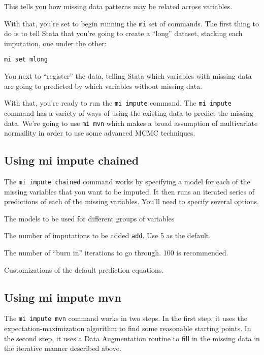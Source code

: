 \documentclass[12 pt]{article}
\begin{document}
This tells you how missing data patterns may be related across
variables. 

With that, you're set to begin running the \texttt{mi} set of
commands. The first thing to do is to tell Stata that you're going to
create a ``long'' dataset, stacking each imputation, one under the
other:

\texttt{mi set mlong}

You next to ``register'' the data, telling Stata which variables with
missing data are going to predicted by which variables without missing
data. 

With that, you're ready to run the \texttt{mi impute} command. The
\texttt{mi impute} command has a variety of ways of using the existing
data to predict the missing data. We're going to use \texttt{mi mvn}
which makes a broad assumption of multivariate normaility in order to
use some advanced MCMC techniques. 


\subsection{Using mi impute chained}
\label{sec:using-mi-impute}

The \texttt{mi impute chained} command works by specifying a model for
each of the missing variables that you want to be imputed. It then
runs an iterated series of predictions of each of the missing
variables.  You'll need to specify several options.

\begin{description}

\item The models to be used for different groups of variables
\item  The number of imputations to be added \texttt{add}. Use 5 as
  the default. 
\item The number of ``burn in'' iterations to go through. 100 is
  recommended. 
\item Customizations of the default prediction equations.
\end{description}


\subsection{Using mi impute mvn}

The \texttt{mi impute mvn} command works in two steps. In the first
step, it uses the expectation-maximization algorithm to find some
reasonable starting points. In the second step, it uses a Data
Augmentation routine to fill in the missing data in the iterative
manner described above. 
\end{document}
